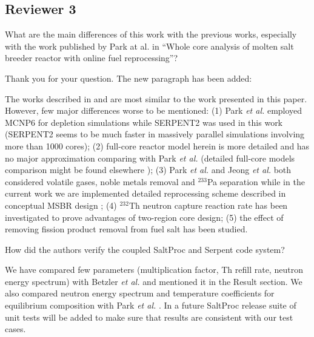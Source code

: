 \documentclass[answers,11pt]{exam}
\begin{document}
\begin{questions}






        \section*{Reviewer 3}


        \question  What are the main differences of this work with the previous 
        works, especially with the work published by Park at al. in ``Whole core 
        analysis of molten salt breeder reactor with online fuel reprocessing''?
        \begin{solution}
                Thank you for your question. The new paragraph has been added:
                
                The works described in \cite{park_whole_2015} and 
                \cite{jeong_equilibrium_2016} are most similar to the work 
                presented in this paper. However, few major differences worse to 
                be mentioned: (1) Park \emph{et al.} employed MCNP6 for depletion 
				simulations while SERPENT2 was used in this work (SERPENT2 seems 
				to be much faster in massively parallel simulations involving more 
				than 1000 cores); (2) full-core reactor model herein is more 
				detailed and has no major approximation comparing with Park \emph{et al.}
				(detailed full-core models comparison might be found elsewhere
				\cite{rykhlevskii_full-core_2017}); (3) Park \emph{et al.} and 
				Jeong \emph{et al.} both considered volatile gases, noble metals 
				removal and $^{233}$Pa separation while in the current work we are 
				implemented detailed reprocessing scheme described in conceptual 
				MSBR design \cite{robertson_conceptual_1971}; (4) $^{232}$Th 
				neutron capture reaction rate has been investigated to prove 
				advantages of two-region core design; (5) the effect of removing 
				fission product removal from fuel salt has been studied. 
        \end{solution}

        \question  How did the authors verify the coupled SaltProc and Serpent 
        code system?  
        \begin{solution}
                We have compared few parameters (multiplication factor, Th refill 
                rate, neutron energy spectrum) with Betzler \emph{et al.} 											\cite{betzler_molten_2017} and mentioned it in the Result section. 
                We also compared neutron energy spectrum and temperature coefficients
                 for equilibrium composition with Park \emph{et al.} \cite{park_whole_2015}.
                In a future SaltProc release suite of unit tests will be added 
                to make sure that results are consistent with our test cases.
        \end{solution}


\end{questions}
\end{document}

